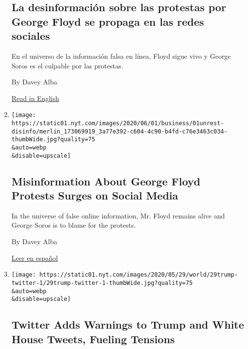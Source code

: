 \begin{enumerate}
  \hypertarget{la-desinformaciuxf3n-sobre-las-protestas-por-george-floyd-se-propaga-en-las-redes-sociales}{%
  \subsection{La desinformación sobre las protestas por George Floyd se
  propaga en las redes
  sociales}\label{la-desinformaciuxf3n-sobre-las-protestas-por-george-floyd-se-propaga-en-las-redes-sociales}}

  En el universo de la información falsa en línea, Floyd sigue vivo y
  George Soros es el culpable por las protestas.

  By Davey Alba

  \href{https://www.nytimes.com/2020/06/01/technology/george-floyd-misinformation-online.html}{Read
  in English}
\item
  \href{/2020/06/01/technology/george-floyd-misinformation-online.html}{}

  \texttt{[image: https://static01.nyt.com/images/2020/06/01/business/01unrest-disinfo/merlin\_173069919\_3a77e392-c604-4c90-b4fd-c76e3463c034-thumbWide.jpg?quality=75\\\&auto=webp\\\&disable=upscale]}

  \hypertarget{misinformation-about-george-floyd-protests-surges-on-social-media}{%
  \subsection{Misinformation About George Floyd Protests Surges on
  Social
  Media}\label{misinformation-about-george-floyd-protests-surges-on-social-media}}

  In the universe of false online information, Mr. Floyd remains alive
  and George Soros is to blame for the protests.

  By Davey Alba

  \href{https://www.nytimes.com/es/2020/06/03/espanol/ciencia-y-tecnologia/george-floyd-desinformacion-fake-news.html}{Leer
  en español}
\item
  \href{/2020/05/29/technology/trump-twitter-minneapolis-george-floyd.html}{}

  \texttt{[image: https://static01.nyt.com/images/2020/05/29/world/29trump-twitter-1/29trump-twitter-1-thumbWide.jpg?quality=75\\\&auto=webp\\\&disable=upscale]}

  \hypertarget{twitter-adds-warnings-to-trump-and-white-house-tweets-fueling-tensions}{%
  \subsection{Twitter Adds Warnings to Trump and White House Tweets,
  Fueling
  Tensions}\label{twitter-adds-warnings-to-trump-and-white-house-tweets-fueling-tensions}}


\end{enumerate}
